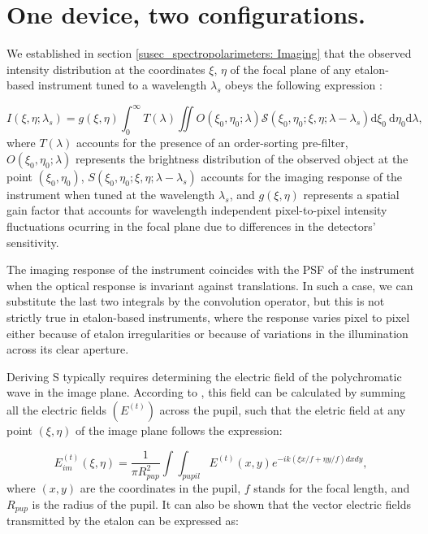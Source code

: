 \section{One device, two configurations.}

We established in section \ref{susec_spectropolarimeters: Imaging} that the observed intensity distribution at the coordinates $\xi$, $\eta$ of the focal plane of any etalon-based instrument tuned to a wavelength $\lambda_s$ obeys the following expression \citep{franI}: 

\begin{equation}
    I\left(\xi, \eta ; \lambda_{s}\right)=g(\xi, \eta)\int_{0}^{\infty} T(\lambda) \iint  O\left(\xi_0, \eta_0 ; \lambda\right)  \mathcal{S}\left(\xi_0, \eta_0; \xi , \eta; \lambda-\lambda_{s}\right)  \mathrm{d} \xi_{0} \mathrm{~d} \eta_{0}\mathrm{d} \lambda ,
    \label{eq_etalon_theory: General_Intensity}
\end{equation}
where $T(\lambda)$ accounts for the presence of an order-sorting pre-filter, $O\left(\xi_0, \eta_0 ; \lambda\right)$ represents the brightness distribution of the observed object at the point $\left(\xi_0, \eta_0\right)$, $S\left(\xi_0, \eta_0; \xi , \eta; \lambda-\lambda_{s}\right)$ accounts for the imaging response of the instrument when tuned at the wavelength $\lambda_{s}$, and $g(\xi, \eta)$ represents a spatial gain factor that accounts for wavelength independent pixel-to-pixel intensity fluctuations ocurring in the focal plane due to differences in the detectors' sensitivity. 

The imaging response of the instrument coincides with the PSF of the instrument when the optical response is invariant against translations. In such a case, we can substitute the last two integrals by the convolution operator, but this is not strictly true in etalon-based instruments, where the response varies pixel to pixel either because of etalon irregularities or because of variations in the illumination across its clear aperture.

Deriving S typically requires determining the electric field of the polychromatic wave in the image plane. According to \cite{franI}, this field can be calculated by summing all the electric fields $(E^{(t)})$ across the pupil, such that the eletric field at any point $(\xi, \eta)$ of the image plane follows the expression:

\begin{equation}
  E_{im} ^{(t)}(\xi, \eta) = \frac{1}{\pi R_{pup} ^2} \int \int _ {pupil} E^{(t)}(x, y)e ^{-ik( \xi x / f + \eta y / f)dx dy},
  \label{eq_etalon_theory: electric_image_plane}
\end{equation}
where $(x, y)$ are the coordinates in the pupil, $f$ stands for the focal length, and $R_{pup}$ is the radius of the pupil.  It can also be shown that the vector electric fields transmitted by the etalon can be expressed as:

